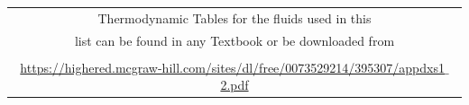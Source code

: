 


\begin{center}
\begin{tabular}{||c||}
\hline \hline
Thermodynamic Tables for the fluids used in this  \\
list can be found in any Textbook or be downloaded from \\
  \\
\href{https://highered.mcgraw-hill.com/sites/dl/free/0073529214/395307/appdxs1_2.pdf}{https://highered.mcgraw-hill.com/sites/dl/free/0073529214/395307/appdxs1$\_$2.pdf} \\
\hline\hline
\end{tabular}
\end{center}


